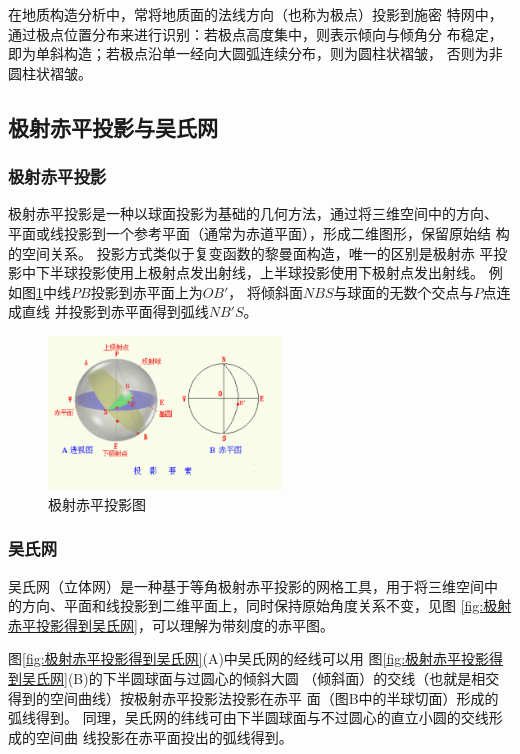 \documentclass[a4paper,twoside]{ctexart}
\begin{document}
在地质构造分析中，常将地质面的法线方向（也称为极点）投影到施密
特网中，通过极点位置分布来进行识别：若极点高度集中，则表示倾向与倾角分
布稳定，即为单斜构造；若极点沿单一经向大圆弧连续分布，则为圆柱状褶皱，
否则为非圆柱状褶皱。

\subsection{极射赤平投影与吴氏网}

\subsubsection{极射赤平投影}
极射赤平投影是一种以球面投影为基础的几何方法，通过将三维空间中的方向、
平面或线投影到一个参考平面（通常为赤道平面），形成二维图形，保留原始结
构的空间关系。 投影方式类似于复变函数的黎曼面构造，唯一的区别是极射赤
平投影中下半球投影使用上极射点发出射线，上半球投影使用下极射点发出射线。
例如图\ref{fig:极射赤平投影图}中线$PB$投影到赤平面上为$OB'$，
将倾斜面$NBS$与球面的无数个交点与$P$点连成直线
并投影到赤平面得到弧线$NB'S$。   

\begin{figure}[htbp]
  \centering
    \includegraphics[width=0.55\textwidth]{pic/级射赤平投影图.png}
  \caption{极射赤平投影图}
  \label{fig:极射赤平投影图}
\end{figure}

\subsubsection{吴氏网}

吴氏网（立体网）是一种基于等角极射赤平投影的网格工具，用于将三维空间中
的方向、平面和线投影到二维平面上，同时保持原始角度关系不变，见图
\ref{fig:极射赤平投影得到吴氏网}，可以理解为带刻度的赤平图。

图\ref{fig:极射赤平投影得到吴氏网}(A)中吴氏网的经线可以用
图\ref{fig:极射赤平投影得到吴氏网}(B)的下半圆球面与过圆心的倾斜大圆
（倾斜面）的交线（也就是相交得到的空间曲线）按极射赤平投影法投影在赤平
面（图B中的半球切面）形成的弧线得到。 
同理，吴氏网的纬线可由下半圆球面与不过圆心的直立小圆的交线形成的空间曲
线投影在赤平面投出的弧线得到。
\end{document}
